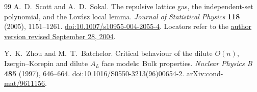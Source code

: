 \documentclass[11pt]{article}
\numberwithin{equation}{section}
\theoremstyle{definition}\newtheorem{definition}[theorem]{Definition}
\theoremstyle{remark}\newtheorem{remark}[theorem]{Remark}
\begin{document}
\begin{thebibliography}{99}
A.~D.~Scott and A.~D.~Sokal.
The repulsive lattice gas, the independent-set polynomial, and the
Lov\'asz local lemma.
\emph{Journal of Statistical Physics} \textbf{118} (2005), 1151--1261.
\href{https://doi.org/10.1007/s10955-004-2055-4}{doi:10.1007/s10955-004-2055-4}.
Locators refer to the
\href{https://people.maths.ox.ac.uk/~scott/Papers/lovasz.pdf}{author version
revised September 28, 2004}.

Y.~K.~Zhou and M.~T.~Batchelor.
Critical behaviour of the dilute $O(n)$, Izergin--Korepin and dilute
$A_L$ face models: Bulk properties.
\emph{Nuclear Physics B} \textbf{485} (1997), 646--664.
\href{https://doi.org/10.1016/S0550-3213(96)00654-2}{doi:10.1016/S0550-3213(96)00654-2}.
\href{https://arxiv.org/abs/cond-mat/9611156}{arXiv:cond-mat/9611156}.

\end{thebibliography}
\end{document}
